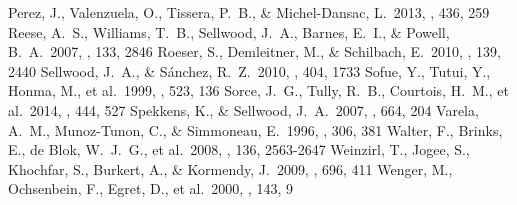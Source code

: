\documentclass[a4paper,fleqn,usenatbib]{mnras}
\begin{document}
\begin{thebibliography}{99}
 Perez, J., Valenzuela, O., Tissera, P.~B., \& Michel-Dansac, L.\ 2013, \mnras, 436, 259
 Reese, A.~S., Williams, T.~B., Sellwood, J.~A., Barnes, E.~I., \& Powell, B.~A.\ 2007, \aj, 133, 2846
 Roeser, S., Demleitner, M., \& Schilbach, E.\ 2010, \aj, 139, 2440  
 Sellwood, J.~A., \& S{\'a}nchez, R.~Z.\ 2010, \mnras, 404, 1733
 Sofue, Y., Tutui, Y., Honma, M., et al.\ 1999, \apj, 523, 136
 Sorce, J.~G., Tully, R.~B., Courtois, H.~M., et al.\ 2014, \mnras, 444, 527 
 Spekkens, K., \& Sellwood, J.~A.\ 2007, \apj, 664, 204  
 Varela, A.~M., Munoz-Tunon, C., \& Simmoneau, E.\ 1996, \aap, 306, 381
 Walter, F., Brinks, E., de Blok, W.~J.~G., et al.\ 2008, \aj, 136, 2563-2647
 Weinzirl, T., Jogee, S., Khochfar, S., Burkert, A., \& Kormendy, J.\ 2009, \apj, 696, 411
 Wenger, M., Ochsenbein, F., Egret, D., et al.\ 2000, \aaps, 143, 9
\end{thebibliography}

\bsp	%
\label{lastpage}
\end{document}
